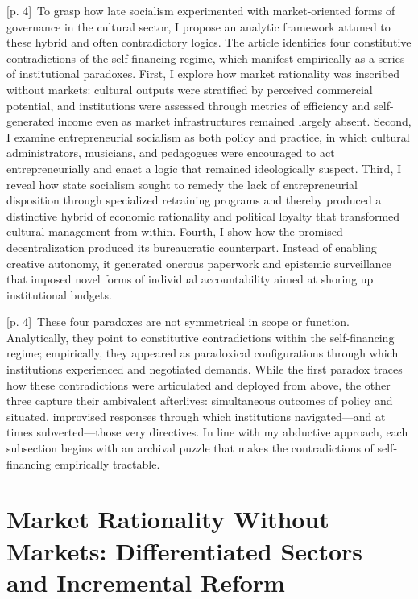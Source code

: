 \documentclass[10pt,a4paper]{article}
\begin{document}
{\scriptsize\color{gray} [p. 4]}\ To grasp how late socialism experimented with market-oriented forms of governance in the cultural sector, I propose an analytic framework attuned to these hybrid and often contradictory logics. The article identifies four constitutive contradictions of the self-financing regime, which manifest empirically as a series of institutional paradoxes. First, I explore how market rationality was inscribed without markets: cultural outputs were stratified by perceived commercial potential, and institutions were assessed through metrics of efficiency and self-generated income even as market infrastructures remained largely absent. Second, I examine entrepreneurial socialism as both policy and practice, in which cultural administrators, musicians, and pedagogues were encouraged to act entrepreneurially and enact a logic that remained ideologically suspect. Third, I reveal how state socialism sought to remedy the lack of entrepreneurial disposition through specialized retraining programs and thereby produced a distinctive hybrid of economic rationality and political loyalty that transformed cultural management from within. Fourth, I show how the promised decentralization produced its bureaucratic counterpart. Instead of enabling creative autonomy, it generated onerous paperwork and epistemic surveillance that imposed novel forms of individual accountability aimed at shoring up institutional budgets.\par
{\scriptsize\color{gray} [p. 4]}\ These four paradoxes are not symmetrical in scope or function. Analytically, they point to constitutive contradictions within the self-financing regime; empirically, they appeared as paradoxical configurations through which institutions experienced and negotiated demands. While the first paradox traces how these contradictions were articulated and deployed from above, the other three capture their ambivalent afterlives: simultaneous outcomes of policy and situated, improvised responses through which institutions navigated—and at times subverted—those very directives. In line with my abductive approach, each subsection begins with an archival puzzle that makes the contradictions of self-financing empirically tractable.\par
{}\section*{Market Rationality Without Markets: Differentiated Sectors and Incremental Reform}
\end{document}
